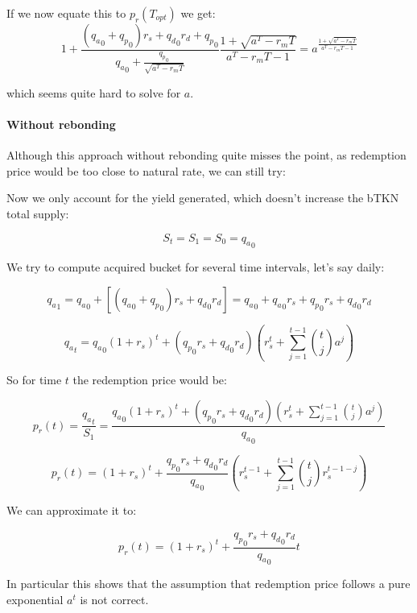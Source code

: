 \documentclass{article}
\begin{document}
If we now equate this to $p_r(T_{opt})$ we get:
\begin{equation}
  \label{}
1 + \frac{({q_a}_0 + {q_p}_0)r_s + {q_d}_0 r_d + {q_p}_0}{{q_a}_0 + \frac{{q_p}_0}{\sqrt{a^T - r_mT}}} \frac{1+ \sqrt{a^T - r_mT}}{a^T - r_mT - 1} = a ^{\frac{1+ \sqrt{a^T - r_mT}}{a^T - r_mT - 1}}
\end{equation}

which seems quite hard to solve for $a$.

\paragraph{Without rebonding}

Although this approach without rebonding quite misses the point, as redemption price would be too close to natural rate, we can still try:

Now we only account for the yield generated, which doesn’t increase the bTKN total supply:

\[
S_t = S_1 = S_0 = {q_a}_0
\]

We try to compute acquired bucket for several time intervals, let’s say daily:

\[
{q_a}_1 = {q_a}_0 + [({q_a}_0 + {q_p}_0) r_s + {q_d}_0 r_d] = {q_a}_0 + {q_a}_0 r_s + {q_p}_0 r_s + {q_d}_0 r_d
\]

\[
{q_a}_t = {q_a}_0(1+r_s)^t + ({q_p}_0 r_s + {q_d}_0 r_d) \left(r_s^t + \sum_{j=1}^{t-1} \binom{t}{j} a^j \right)
\]

So for time $t$ the redemption price would be:

\[
p_r(t) = \frac{{q_a}_t}{S_1} = \frac{{q_a}_0(1+r_s)^t + ({q_p}_0 r_s + {q_d}_0 r_d) \left(r_s^t + \sum_{j=1}^{t-1} \binom{t}{j} a^j \right)}{{q_a}_0}
\]

\begin{equation}
  \label{eq:conservative_p_r_base_2_a}
p_r(t) = (1+r_s)^t + \frac{{q_p}_0 r_s + {q_d}_0 r_d}{{q_a}_0} \left(r_s^{t-1} + \sum_{j=1}^{t-1} \binom{t}{j} r_s^{t-1-j} \right)
\end{equation}

We can approximate it to:

\begin{equation}
  \label{eq:conservative_p_r_base_2_b}
p_r(t) = (1+r_s)^t + \frac{{q_p}_0 r_s + {q_d}_0 r_d}{{q_a}_0} t
\end{equation}

In particular this shows that the assumption that redemption price follows a pure exponential $a^t$ is not correct.
\end{document}
